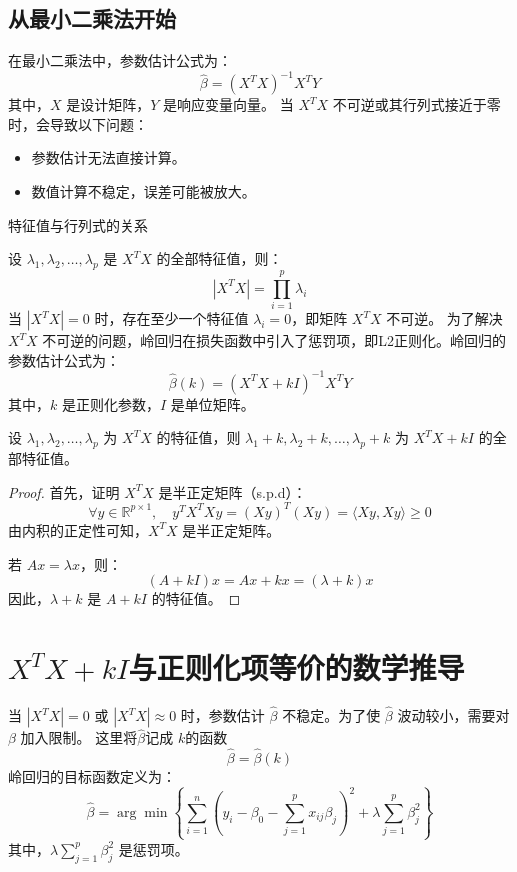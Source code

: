\documentclass[lang=cn,11pt,a4paper]{elegantpaper}
\begin{document}
\subsection{从最小二乘法开始}
在最小二乘法中，参数估计公式为：
\begin{equation}
\hat{\beta} = (X^T X)^{-1} X^T Y
\end{equation}
其中，\( X \) 是设计矩阵，\( Y \) 是响应变量向量。
当 \( X^T X \) 不可逆或其行列式接近于零时，会导致以下问题：
\begin{itemize}
    \item 参数估计无法直接计算。
    \item 数值计算不稳定，误差可能被放大。
\end{itemize}
特征值与行列式的关系
\par
设 \( \lambda_1, \lambda_2, \dots, \lambda_p \) 是 \( X^T X \) 的全部特征值，则：
\begin{equation}
|X^T X| = \prod_{i=1}^p \lambda_i
\end{equation}
当 \( |X^T X| = 0 \) 时，存在至少一个特征值 \( \lambda_i = 0 \)，即矩阵 \( X^T X \) 不可逆。
为了解决 \( X^T X \) 不可逆的问题，岭回归在损失函数中引入了惩罚项，即L2正则化。岭回归的参数估计公式为：
\begin{equation}
\hat{\beta}(k) = (X^T X + k I)^{-1} X^T Y
\end{equation}
其中，\( k \) 是正则化参数，\( I \) 是单位矩阵。
\begin{theorem}
设 \( \lambda_1, \lambda_2, \dots, \lambda_p \) 为 \( X^T X \) 的特征值，则 \( \lambda_1 + k, \lambda_2 + k, \dots, \lambda_p + k \) 为 \( X^T X + k I \) 的全部特征值。
\end{theorem}

\begin{proof}
首先，证明 \( X^T X \) 是半正定矩阵（s.p.d）：
\[
\forall y \in \mathbb{R}^{p \times 1}, \quad y^T X^T X y = (X y)^T (X y) = \langle X y, X y \rangle \geq 0
\]
由内积的正定性可知，\( X^T X \) 是半正定矩阵。

若 \( A x = \lambda x \)，则：
\[
(A + k I) x = A x + k x = (\lambda + k) x
\]
因此，\( \lambda + k \) 是 \( A + k I \) 的特征值。
\end{proof}

\section{$X^T X + k I$与正则化项等价的数学推导}
当 \( |X^T X| = 0 \) 或 \( |X^T X| \approx 0 \) 时，参数估计 \(\hat{\beta}\) 不稳定。为了使 \(\hat{\beta}\) 波动较小，需要对 \(\beta\) 加入限制。
这里将\(\hat{\beta}\)记成 \(k\)的函数
\begin{equation}
    \hat{\beta}=\hat{\beta}(k)
\end{equation}
岭回归的目标函数定义为：
\begin{equation}
\hat{\beta} = \arg \min \left\{ \sum_{i=1}^n \left( y_i - \beta_0 - \sum_{j=1}^p x_{ij} \beta_j \right)^2 + \lambda \sum_{j=1}^p \beta_j^2 \right\}
\end{equation}
其中，\(\lambda \sum_{j=1}^p \beta_j^2\) 是惩罚项。
\end{document}
